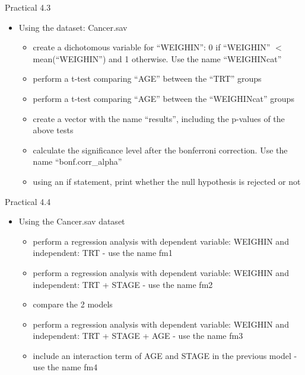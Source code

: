 \documentclass[14pt, aspectratio=169, sectionpage=simple, xclolor=table]{beamer}
\begin{document}
\begin{frame}{Practical 4.3}
\begin{itemize}
\item Using the dataset: Cancer.sav
\begin{itemize}
\item create a dichotomous variable for \enquote{WEIGHIN}: 0 if \enquote{WEIGHIN} $<$ mean(\enquote{WEIGHIN}) and 1 otherwise. Use the name \enquote{WEIGHINcat}
\item perform a t-test comparing \enquote{AGE} between the \enquote{TRT} groups
\item perform a t-test comparing \enquote{AGE} between the \enquote{WEIGHINcat} groups
\item create a vector with the name \enquote{results}, including the p-values of the above tests
\item calculate the significance level after the bonferroni correction. Use the name \enquote{bonf.corr\_alpha}
\item using an if statement, print whether the null hypothesis is rejected or not
\end{itemize}
\end{itemize}
\end{frame}
\begin{frame}{Practical 4.4}
\begin{itemize}
\item Using the Cancer.sav dataset
\begin{itemize}
\item perform a regression analysis with dependent variable: WEIGHIN and independent: TRT - use the name fm1
\item perform a regression analysis with dependent variable: WEIGHIN and independent: TRT + STAGE - use the name fm2
\item compare the 2 models
\item perform a regression analysis with dependent variable: WEIGHIN and independent: TRT + STAGE + AGE - use the name fm3
\item include an interaction term of AGE and STAGE in the previous model - use the name fm4
\end{itemize}
\end{itemize}
\end{frame}
\end{document}
